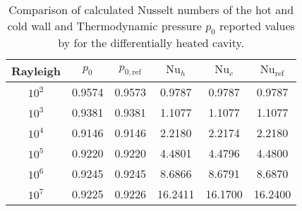 \begin{table}[t!]
	\begin{center}
		\begin{tabular}{cccccc}
			\hline
			Rayleigh                           & $p_0$  & $p_{0,\text{ref}}$ & $\text{Nu}_{h}$ & $\text{Nu}_{c}$ & $\text{Nu}_{\text{ref}}$ \\ \hline
			\parbox[0pt][13pt][c]{0pt}{}$10^2$ & 0.9574 & 0.9573             & 0.9787          & 0.9787          & 0.9787                   \\
			$10^3$                             & 0.9381 & 0.9381             & 1.1077          & 1.1077          & 1.1077                   \\
			$10^4$                             & 0.9146 & 0.9146             & 2.2180          & 2.2174          & 2.2180                   \\
			$10^5$                             & 0.9220 & 0.9220             & 4.4801          & 4.4796          & 4.4800                   \\
			$10^6$                             & 0.9245 & 0.9245             & 8.6866          & 8.6791          & 8.6870                   \\
			$10^7$                             & 0.9225 & 0.9226             & 16.2411         & 16.1700         & 16.2400                  \\ \hline
		\end{tabular}
	\end{center}
	\caption[Differentially heated cavity: Results of Nusselt number and Thermodynamic pressure]{Comparison of calculated Nusselt numbers of the hot and cold wall and Thermodynamic pressure $p_0$ reported values by \cite{vierendeelsBenchmarkSolutionsNatural2003} for the differentially heated cavity.}
	\label{tab:p0_Nu_Results}
\end{table}